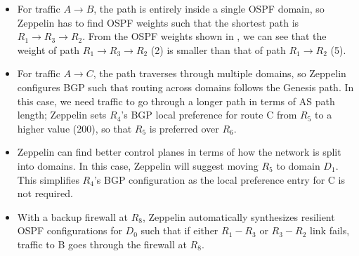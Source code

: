 \begin{itemize}
	\item
For traffic $A \rightarrow B$, the path is entirely inside
a single OSPF domain, so Zeppelin has to find OSPF weights 
such that the shortest path is $R_1 \rightarrow R_3 \rightarrow 
R_2$. From the OSPF weights shown in , 
we can see that the weight of path $R_1 
\rightarrow R_3 \rightarrow R_2$ (2) is smaller than that of path
$R_1 \rightarrow R_2$ (5). 
 	\item For traffic $A \rightarrow C$, the path traverses through 
 	multiple domains, so Zeppelin configures BGP such that 
 	routing across domains follows the Genesis path. In this case, 
 	we need traffic to go through a longer path in terms of AS path
 	length; Zeppelin sets $R_4$'s BGP local preference for route C
 	from $R_5$ to a higher value (200), so that $R_5$ is 
 	preferred over $R_6$. 
 	\item Zeppelin can find better control planes in terms of how 
 	the network is split into domains. In this case,  
 	Zeppelin will suggest moving $R_5$ to domain $D_1$. 
 	This simplifies $R_4$'s BGP configuration as the local preference 
 	entry for C is not required. 
 	\item With a backup firewall at $R_8$, 
 	Zeppelin automatically synthesizes resilient OSPF configurations
          for $D_0$ such that if either $R_1-R_3$ or $R_3-R_2$ link
          fails, traffic to B goes through the firewall at $R_8$.
\end{itemize}
